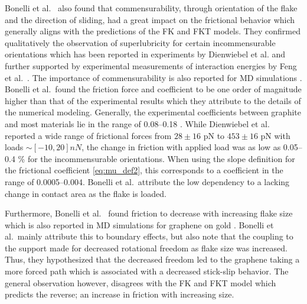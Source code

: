 Bonelli et al.\ \cite{bonelli_atomistic_2009} also found that commensurability,
through orientation of the flake and the direction of sliding, had a great
impact on the frictional behavior which generally aligns with the predictions of
the \acrshort{FK} and \acrshort{FKT} models. They confirmed qualitatively the
observation of superlubricity for certain incommensurable orientations which has
been reported in experiments by Dienwiebel et al.\cite{DIENWIEBEL2005197} and
further supported by experimental measurements of interaction energies by Feng
et al.\ \cite{feng_superlubric_2013}. The importance of commensurability is also
reported for \acrshort{MD} simulations \cite{ma12091425, zhu_study_2018,
Wijn_2011}. Bonelli et al.\ found the friction force and coefficient to be one
order of magnitude higher than that of the experimental results which they
attribute to the details of the numerical modeling. Generally, the experimental
coefficients between graphite and most materials lie in the range of 0.08--0.18
\cite{DIENWIEBEL2005197}. While Dienwiebel et al.\ \cite{DIENWIEBEL2005197}
reported a wide range of frictional forces from $28 \pm 16$ pN to $453 \pm 16$
pN with loads $\sim [-10, 20] nN$, the change in friction with applied load was
as low as 0.05--0.4 \% for the incommensurable orientations. When using the slope definition for the frictional coefficient \cref{eq:mu_def2}, this corresponds to a coefficient in the range of 0.0005--0.004. Bonelli et al.\ attribute the low dependency to a lacking change in contact area as the flake is loaded. 

Furthermore, Bonelli et al.\ \cite{bonelli_atomistic_2009} found friction to decrease with increasing flake size which is also reported in \acrshort{MD} simulations for graphene on gold \cite{zhu_study_2018}. Bonelli et al.\ mainly attribute this to boundary effects, but also note that the coupling to the support made for decreased rotational freedom as flake size was increased. Thus, they hypothesized that the decreased freedom led to the graphene taking a more forced path which is associated with a decreased stick-slip behavior. The general observation however, disagrees with the \acrshort{FK} and \acrshort{FKT} model which predicts the reverse; an increase in friction with increasing size. 

